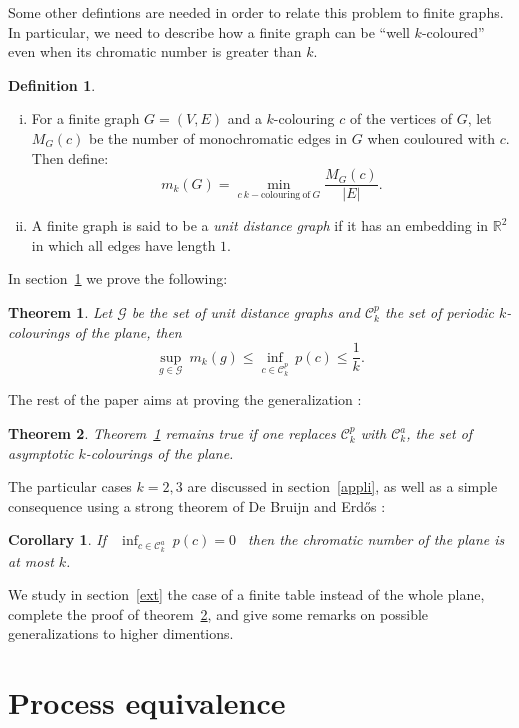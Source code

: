 \documentclass[a4paper,11pt]{article}
\newtheorem{cons}{Corollary}
\newtheorem{theo}{Theorem}
\theoremstyle{definition}
\newtheorem{definition}{Definition}
\theoremstyle{remark}
\newcommand{\R}{\mathbb{R}}
\newcommand{\Cp}{\mathcal{C}^{p}}
\newcommand{\Ca}{\mathcal{C}^{a}}
\begin{document}
Some other defintions are needed in order to relate this problem to finite
graphs. In particular, we need to describe how a finite
graph can be ``well $k$-coloured'' even when its chromatic number is greater
than $k$.
\begin{definition}
\ 
\begin{enumerate}[i)]
\item For a finite graph $G=(V,E)$ and a $k$-colouring $c$ of the vertices of $G$, 
let $M_G(c)$ be the number of monochromatic edges in $G$ when couloured with $c$.
Then define:
\[m_k(G) = \min_{c \ k-\mathrm{colouring \ of} \ G} \frac{M_G(c)}{|E|}.\]
\item A finite graph is said to be a \emph{unit distance graph} if it has 
an embedding in $\R^2$ in which all edges have length $1$.
\end{enumerate}
\end{definition}
In section~\ref{equiv} we prove the following:
\begin{theo} \label{ineg}
Let $\mathcal{G}$ be the set of unit distance graphs and $\Cp_k$ the set 
of periodic $k$-colourings of the plane, then
$$ \sup_{g \in \mathcal{G}} \ m_k(g) \leq \inf_{c \in \Cp_k} \ p(c) \leq \frac{1}{k}. $$
\end{theo}
The rest of the paper aims at proving the generalization :
\begin{theo} \label{ineg2}
Theorem~\ref{ineg} remains true if one replaces $\Cp_k$ with $\Ca_k$, the set of
asymptotic $k$-colourings of the plane.
\end{theo}

The particular cases $k=2,3$ are discussed in section~\ref{appli}, as well as a 
simple consequence using a strong theorem of De Bruijn and Erd\H{o}s :
\begin{cons}\label{con}
If \ $\inf_{c \in \Ca_k} \ p(c) = 0$ \ then the chromatic number of the
plane is at most $k$.
\end{cons}
We study in section~\ref{ext} the case of a finite table instead of the whole plane,
complete the proof of theorem~\ref{ineg2}, and give some remarks on possible 
generalizations to higher dimentions.

\section{Process equivalence}
\label{equiv}

\end{document}
